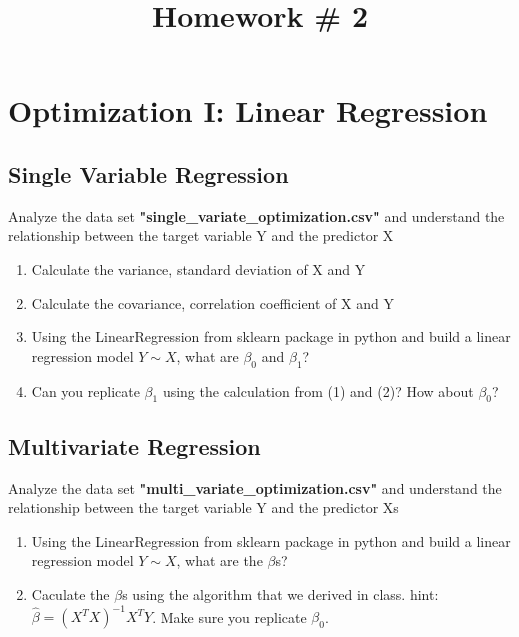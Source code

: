 \documentclass{article}
\title{Homework \#	2} %
\begin{document}
\maketitle %
\thispagestyle{fancy}
\pagestyle{fancy}

\section{Optimization I: Linear Regression}

\subsection{Single Variable Regression}
Analyze the data set \textbf{"single\_variate\_optimization.csv"} and understand the relationship between the target variable Y and the predictor X
\begin{enumerate}[(1)]
\item Calculate the variance, standard deviation of X and Y
\item Calculate the covariance, correlation coefficient of X and Y
\item Using the LinearRegression from sklearn package in python and build a linear regression model $Y\sim X$, what are $\beta_0$ and $\beta_1$?
\item Can you replicate $\beta_1$ using the calculation from (1) and (2)? How about $\beta_0$?  
\end{enumerate}

\subsection{Multivariate Regression}
Analyze the data set \textbf{"multi\_variate\_optimization.csv"} and understand the relationship between the target variable Y and the predictor Xs

\begin{enumerate}[(1)]
\item Using the LinearRegression from sklearn package in python and build a linear regression model $Y\sim X$, what are the $\beta$s?

\item Caculate the $\beta$s using the algorithm that we derived in class. hint: $\hat{
\beta}=(X^TX)^{-1}X^TY$. Make sure you replicate $\beta_0$. 
\end{enumerate}
\end{document}
